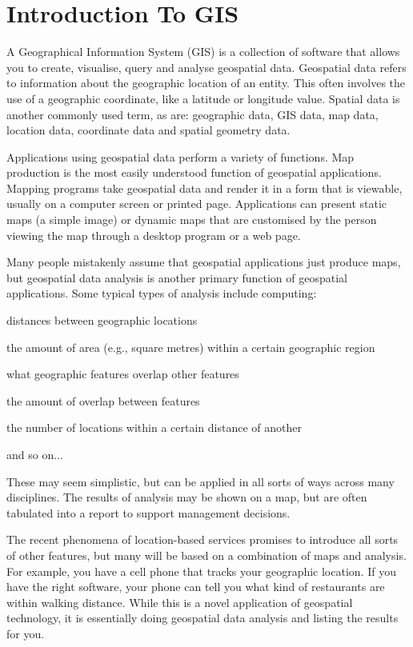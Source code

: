 \chapter{Introduction To GIS}

A Geographical Information System (GIS) is a collection of software that allows you to create, visualise, query and analyse geospatial data. Geospatial data refers to information about the geographic location of an entity. This often involves the use of a geographic coordinate, like a latitude or longitude value. Spatial data is another commonly used term, as are: geographic data, GIS data, map data, location data, coordinate data and spatial geometry data.

Applications using geospatial data perform a variety of functions. Map production is the most easily understood function of geospatial applications. Mapping programs take geospatial data and render it in a form that is viewable, usually on a computer screen or printed page. Applications can present static maps (a simple image) or dynamic maps that are customised by the person viewing the map through a desktop program or a web page.

Many people mistakenly assume that geospatial applications just produce maps, but geospatial data analysis is another primary function of geospatial applications. Some typical types of analysis include computing:

\begin{compactenum}
\item distances between geographic locations
\item the amount of area (e.g., square metres) within a certain geographic region
\item what geographic features overlap other features
\item the amount of overlap between features
\item the number of locations within a certain distance of another
\item and so on...
\end{compactenum}

These may seem simplistic, but can be applied in all sorts of ways across many disciplines. The results of analysis may be shown on a map, but are often tabulated into a report to support management decisions.

The recent phenomena of location-based services promises to introduce all sorts of other features, but many will be based on a combination of maps and analysis. For example, you have a cell phone that tracks your geographic location. If you have the right software, your phone can tell you what kind of restaurants are within walking distance. While this is a novel application of geospatial technology, it is essentially doing geospatial data analysis and listing the results for you.

